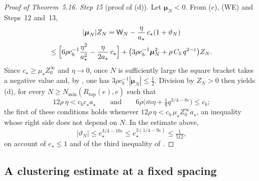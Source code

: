 \documentclass[11pt,letterpaper,reqno]{amsart}
\theoremstyle{definition}
\begin{document}
\begin{proof}[Proof of Theorem~5.16]
\emph{Step 15} (proof of (d)).
Let $\boldsymbol\mu_N<0$.
From (c), (WE) and Steps~12 and~13,
\begin{multline*}
|\boldsymbol\mu_N|Z_N=\mathsf W_N-\frac\eta{a_\star}\,c_\star(1+\vartheta_N)\\
\le\Bigl[6\rho c_b^{-1}\frac{\eta^2}{a_\star^2}-\frac\eta{2a_\star}\,c_\star\Bigr]+\bigl(3\rho c_b^{-1}\boldsymbol\mu_N^2+\rho\,C_5\,q^{2-\varepsilon}\bigr)Z_N .
\end{multline*}
Since $c_\star\ge\mu_\star Z_0^\infty$ and $\eta\to0$, once $N$ is sufficiently large the square bracket takes a negative value and, by \cite[Proposition~28.3\,(d)]{QEDIII}, one has $3\rho c_b^{-1}|\boldsymbol\mu_N|\le\frac12$.
Division by $Z_N>0$ then yields (d), for every $N\ge N_{\min}(R_{\mathrm{top}}(e),e)$ such that
\begin{equation*}
12\rho\,\eta<c_bc_\star a_\star\qquad\text{and}\qquad6\rho\bigl(\bar m\eta+\tfrac18q^{3/4-8\varepsilon}\bigr)\le c_b ;
\end{equation*}
the first of these conditions holds whenever $12\rho\,\eta<c_b\,\mu_\star Z_0^\infty a_\star$, an inequality whose right side does not depend on $N$.
In the estimate above,
\begin{equation*}
|\vartheta_N|\le e_\star^{3/4-10\varepsilon}\le e_\star^{3(1/4-9\varepsilon)}\le\tfrac1{512},
\end{equation*}
on account of $e_\star\le1$ and of the third inequality of \cite[(T2)]{QEDIII}.
\end{proof}


\subsection{A clustering estimate at a fixed spacing}
\end{document}

